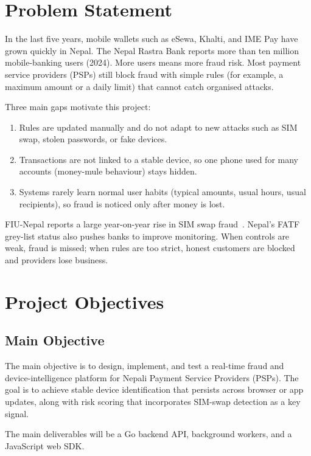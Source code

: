 \section{Problem Statement}

In the last five years, mobile wallets such as eSewa, Khalti, and IME Pay have grown quickly in
Nepal. The Nepal Rastra Bank reports more than ten million mobile-banking users (2024). More
users means more fraud risk. Most payment service providers (PSPs) still block fraud with
simple rules (for example, a maximum amount or a daily limit) that cannot catch organised
attacks.

Three main gaps motivate this project:
\begin{enumerate}
  \item Rules are updated manually and do not adapt to new attacks such as SIM swap, stolen
        passwords, or fake devices.
  \item Transactions are not linked to a stable device, so one phone used for many accounts
        (money-mule behaviour) stays hidden.
  \item Systems rarely learn normal user habits (typical amounts, usual hours, usual recipients),
        so fraud is noticed only after money is lost.
\end{enumerate}

FIU-Nepal reports a large year-on-year rise in SIM swap fraud~\cite{fiu2024}. Nepal's FATF
grey-list status also pushes banks to improve monitoring. When controls are weak, fraud is
missed; when rules are too strict, honest customers are blocked and providers lose business.

\section{Project Objectives}

\subsection{Main Objective}
The main objective is to design, implement, and test a real-time fraud and device-intelligence platform for Nepali Payment Service Providers (PSPs). The goal is to achieve stable device identification that persists across browser or app updates, along with risk scoring that incorporates SIM-swap detection as a key signal.

The main deliverables will be a Go backend API, background workers, and a JavaScript web SDK.

